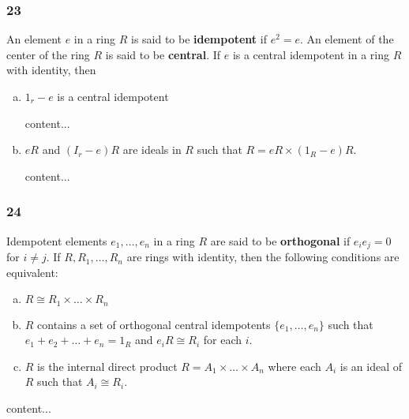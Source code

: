 \subsubsection*{23}
\begin{graybox}
	An element $e$ in a ring $R$ is said to be \textbf{idempotent} if $e^2 = e$. An element of the center of the ring $R$ is said to be \textbf{central}. If $e$ is a central idempotent in a ring $R$ with identity, then 
\end{graybox}
\begin{enumerate}[(a)]
	\item 
	\begin{lightgraybox}
		$1_r - e$ is a central idempotent
	\end{lightgraybox}
	\begin{solution}
		content...
	\end{solution}
	
	\item
	\begin{lightgraybox}
		$eR$ and $(I_r - e)R$ are ideals in $R$ such that $R = eR \times (1_R - e)R$.
	\end{lightgraybox}
	\begin{solution}
		content...
	\end{solution}
\end{enumerate}

\subsubsection*{24}
\begin{graybox}
	Idempotent elements $e_1,\dots,e_n$ in a ring $R$ are said to be \textbf{orthogonal} if $e_ie_j = 0$ for $i \neq j$. If $R,R_1,\dots,R_n$ are rings with identity, then the following conditions are equivalent:
	\begin{enumerate}[(a)]
		\item $R \cong R_1 \times \dots \times R_n$
		\item $R$ contains a set of orthogonal central idempotents $\{e_1,\dots, e_n\}$ such that $e_1 + e_2 + \dots + e_n = 1_R$ and $e_iR \cong R_i$ for each $i$.
		\item $R$ is the internal direct product $R = A_1 \times \dots \times A_n$ where each $A_i$ is an ideal of $R$ such that $A_i \cong R_i$.
	\end{enumerate}
\end{graybox}
\begin{solution}
	content...
\end{solution}

